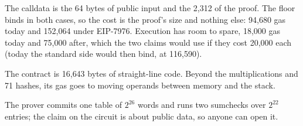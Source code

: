 \documentclass[11pt]{article}
\begin{document}
\noindent The calldata is the 64 bytes of public input and the 2{,}312 of the proof. The floor binds in both cases, so the cost is the proof's size and nothing else: 94{,}680 gas today and 152{,}064 under EIP-7976. Execution has room to spare, 18{,}000 gas today and 75{,}000 after, which the two claims would use if they cost 20{,}000 each (today the standard side would then bind, at 116{,}590).

The contract is 16{,}643 bytes of straight-line code. Beyond the multiplications and 71 hashes, its gas goes to moving operands between memory and the stack.

The prover commits one table of $2^{26}$ words and runs two sumchecks over $2^{22}$ entries; the claim on the circuit is about public data, so anyone can open it.



\end{document}
